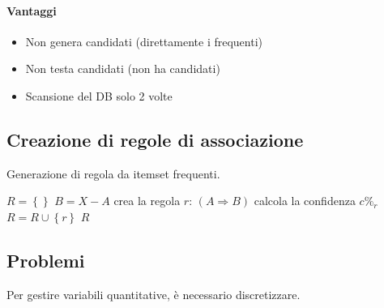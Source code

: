 \documentclass[11pt,onecolumn,a4paper,oneside]{book}
\begin{document}
\paragraph{Vantaggi}
\begin{itemize}
\item Non genera candidati (direttamente i frequenti)
\item Non testa candidati (non ha candidati)
\item Scansione del DB solo 2 volte 
\end{itemize}

\subsection{Creazione di regole di associazione}

\begin{algorithm}
\caption{Generazione di regola da itemset frequenti.}
\begin{algorithmic}
\STATE $R = \left\lbrace \right\rbrace$
\STATE $B = X - A $
\STATE crea la regola $r$: $\left( A \Rightarrow B \right)$
\STATE calcola la confidenza $c\%_r$
\STATE $R = R \cup \left\lbrace r \right\rbrace$
\ENDIF
\ENDFOR
\ENDFOR
\RETURN $R$
\end{algorithmic}
\end{algorithm}

\subsection{Problemi}
Per gestire variabili quantitative, è necessario discretizzare.
\end{document}
